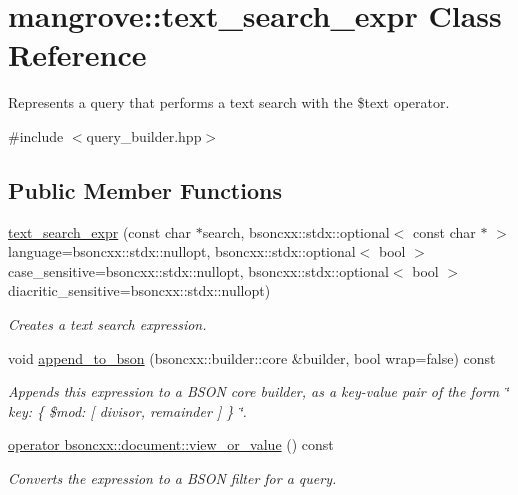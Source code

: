 \hypertarget{classmangrove_1_1text__search__expr}{}\section{mangrove\+:\+:text\+\_\+search\+\_\+expr Class Reference}
\label{classmangrove_1_1text__search__expr}


Represents a query that performs a text search with the \$text operator.  




{\ttfamily \#include $<$query\+\_\+builder.\+hpp$>$}

\subsection*{Public Member Functions}
\begin{DoxyCompactItemize}
\item 
\hyperlink{classmangrove_1_1text__search__expr_a217f9469c2578fe68ffd755f60b64e55}{text\+\_\+search\+\_\+expr} (const char $\ast$search, bsoncxx\+::stdx\+::optional$<$ const char $\ast$ $>$ language=bsoncxx\+::stdx\+::nullopt, bsoncxx\+::stdx\+::optional$<$ bool $>$ case\+\_\+sensitive=bsoncxx\+::stdx\+::nullopt, bsoncxx\+::stdx\+::optional$<$ bool $>$ diacritic\+\_\+sensitive=bsoncxx\+::stdx\+::nullopt)
\begin{DoxyCompactList}\small\item\em Creates a text search expression. \end{DoxyCompactList}\item 
void \hyperlink{classmangrove_1_1text__search__expr_afa08d3a7e99bf76c7459b08f31906733}{append\+\_\+to\+\_\+bson} (bsoncxx\+::builder\+::core \&builder, bool wrap=false) const 
\begin{DoxyCompactList}\small\item\em Appends this expression to a B\+S\+ON core builder, as a key-\/value pair of the form \char`\"{} key\+: \{ \$mod\+: \mbox{[} divisor, remainder \mbox{]} \} \char`\"{}. \end{DoxyCompactList}\item 
\hyperlink{classmangrove_1_1text__search__expr_a7a9ed7a8cee2f356bc269bcae68ca072}{operator bsoncxx\+::document\+::view\+\_\+or\+\_\+value} () const 
\begin{DoxyCompactList}\small\item\em Converts the expression to a B\+S\+ON filter for a query. \end{DoxyCompactList}\end{DoxyCompactItemize}


